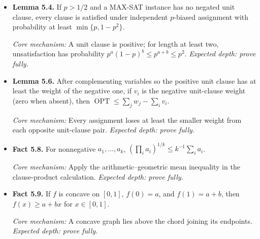 \documentclass[11pt,a4paper]{article}
\newcommand{\OPT}{\operatorname{OPT}}
\newcommand{\1}{\mathbf 1}
\newcommand{\catalogue}[4]{%
  \item \textbf{#1.} #2\par
  {\footnotesize\emph{Core mechanism:} #3
  \emph{Expected depth: #4.}}}
\begin{document}
\begin{itemize}
\catalogue{Lemma 5.4}{If $p>1/2$ and a MAX-SAT instance has no negated unit
clause, every clause is satisfied under independent $p$-biased assignment
with probability at least $\min\{p,1-p^2\}$.}{A unit clause is positive;
for length at least two, unsatisfaction has probability
$p^a(1-p)^b\leq p^{a+b}\leq p^2$.}{prove fully}

\catalogue{Lemma 5.6}{After complementing variables so the positive unit
clause has at least the weight of the negative one, if $v_i$ is the negative
unit-clause weight (zero when absent), then
$\OPT\leq\sum_jw_j-\sum_iv_i$.}{Every assignment loses at least the smaller
weight from each opposite unit-clause pair.}{prove fully}

\catalogue{Fact 5.8}{For nonnegative $a_1,\dots,a_k$,
$(\prod_i a_i)^{1/k}\leq k^{-1}\sum_i a_i$.}{Apply the
arithmetic--geometric mean inequality in the clause-product calculation.}
{prove fully}

\catalogue{Fact 5.9}{If $f$ is concave on $[0,1]$, $f(0)=a$, and
$f(1)=a+b$, then $f(x)\geq a+bx$ for $x\in[0,1]$.}{A concave graph lies
above the chord joining its endpoints.}{prove fully}




















\end{itemize}
\end{document}
